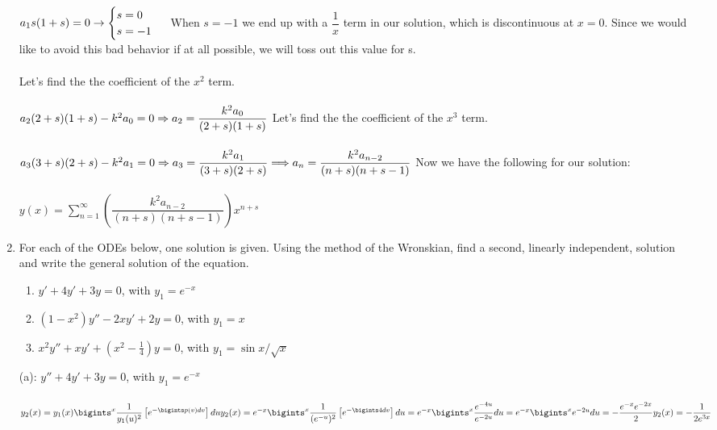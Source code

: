 \documentclass[fleqn]{article}
\begin{document}
\begin{enumerate}
{        $
          a_1s(1+s)=0 \rightarrow \begin{cases}
            s=0 \\
            s=-1
          \end{cases} \\
        $
        When $s=-1$ we end up with a $\dfrac{1}{x}$ term in our solution, which is discontinuous at $x=0$. Since we would like to avoid this bad behavior if at all possible, we will toss out this value for s. \\
        \\
        Let's find the the coefficient of the $x^2$ term. \\
        \\
        $
          a_2(2+s)(1+s)-k^2a_0=0 \Rightarrow a_2=\dfrac{k^2a_0}{(2+s)(1+s)} \\
          \\
        $
        Let's find the the coefficient of the $x^3$ term. \\
        \\
        $
          a_3(3+s)(2+s)-k^2a_1=0 \Rightarrow a_3=\dfrac{k^2a_1}{(3+s)(2+s)} \\
          \\
          \\
          \Longrightarrow a_n=\dfrac{k^2a_{n-2}}{(n+s)(n+s-1)} \\
          \\
        $
        Now we have the following for our solution: \\
        \\
        $
          y(x)=\sum\limits_{n=1}^{\infty} \left(\dfrac{k^2a_{n-2}}{(n+s)(n+s-1)}\right)x^{n+s} 
        $
      }
    
    \item  For each of the ODEs below, one solution is given. Using the method of the Wronskian, find a second, linearly independent, solution and write the general solution of the equation. 
      \begin{enumerate}
      \item $y' +4y'+3y=0$, with $y_1= e^{-x}$

      \item $(1-x^2)y''-2xy'+2y=0 $, with $y_1= x$

      \item $x^2y''+xy'+(x^2-\frac{1}{4})y=0 $, with $y_1=\sin x/\sqrt{x}$
      \end{enumerate}

      \textcolor{hwColor}{
        (a): $y''+4y'+3y=0$, with $y_1=e^{-x}$ \\
        \\
        $
          y_2(x)=y_1(x) \bigints_{}^{x} \dfrac{1}{y_1(u)^2}\left[e^{-\bigints p(v)dv}\right]du \\
          \\
          y_2(x)=e^{-x} \bigints_{}^{x} \dfrac{1}{(e^{-u})^2}\left[e^{-\bigints 4dv}\right]du=e^{-x} \bigints_{}^{x} \dfrac{e^{-4u}}{e^{-2u}}du=e^{-x} \bigints_{}^{x} e^{-2u}du=-\dfrac{e^{-x} e^{-2x}}{2} \\
          \\
          y_2(x)=-\dfrac{1}{2e^{3x}}
        $
      }


\end{enumerate}
\end{document}
